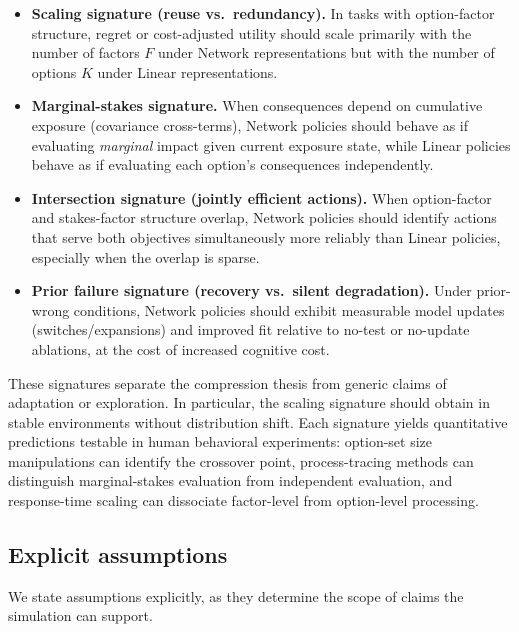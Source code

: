 \documentclass[11pt]{article}
\begin{document}
\begin{itemize}[leftmargin=*]
\item \textbf{Scaling signature (reuse vs.\ redundancy).} In tasks with option-factor structure, regret or cost-adjusted utility should scale primarily with the number of factors $F$ under Network representations but with the number of options $K$ under Linear representations.
\item \textbf{Marginal-stakes signature.} When consequences depend on cumulative exposure (covariance cross-terms), Network policies should behave as if evaluating \emph{marginal} impact given current exposure state, while Linear policies behave as if evaluating each option's consequences independently.
\item \textbf{Intersection signature (jointly efficient actions).} When option-factor and stakes-factor structure overlap, Network policies should identify actions that serve both objectives simultaneously more reliably than Linear policies, especially when the overlap is sparse.
\item \textbf{Prior failure signature (recovery vs.\ silent degradation).} Under prior-wrong conditions, Network policies should exhibit measurable model updates (switches/expansions) and improved fit relative to no-test or no-update ablations, at the cost of increased cognitive cost.
\end{itemize}

These signatures separate the compression thesis from generic claims of adaptation or exploration. In particular, the scaling signature should obtain in stable environments without distribution shift.
Each signature yields quantitative predictions testable in human behavioral experiments: option-set size manipulations can identify the crossover point, process-tracing methods can distinguish marginal-stakes evaluation from independent evaluation, and response-time scaling can dissociate factor-level from option-level processing.


\subsection{Explicit assumptions}

We state assumptions explicitly, as they determine the scope of claims the simulation can support.
\end{document}
